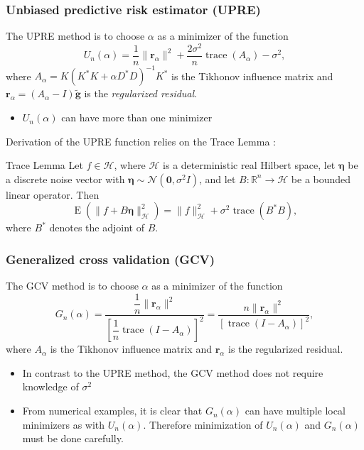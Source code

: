 \documentclass[t]{beamer}
\newcommand{\noiseSD}{\sigma}	%
\DeclareMathOperator{\E}{E}	%
\newcommand{\gnoiseVec}{\widetilde{\mathbf{g}}}	%
\newcommand{\kMat}{K}	%
\newcommand{\ctrans}{*}	%
\DeclareMathOperator{\trace}{trace}		%
\newcommand{\regparam}{\alpha}
\newcommand{\regres}{\mathbf{r}_{\regparam}}	%
\newcommand{\A}{A_{\regparam}}	%
\newcommand{\U}{U}	%
\newcommand{\GCV}{G}	%
\begin{document}
\begin{frame}
\frametitle{Unbiased predictive risk estimator (UPRE)}
The UPRE method \cite{Mallows1973} is to choose $\regparam$ as a minimizer of the function
\[\U_n(\regparam) = \frac{1}{n}\|\regres\|^2 + \frac{2\noiseSD^2}{n}\trace(\A) - \noiseSD^2,\]
where $\A = \kMat(\kMat^\ctrans{\kMat} + \regparam{D^\ctrans}D)^{-1}\kMat^\ctrans$ is the Tikhonov influence matrix and $\regres = (\A - I)\gnoiseVec$ is the \textit{regularized residual}.
\begin{itemize}
\item $\U_n(\regparam)$ can have more than one minimizer \cite[p.~100]{Vogel:2002}
\end{itemize}
Derivation of the UPRE function relies on the Trace Lemma \cite[p.~98]{Vogel:2002}:
\begin{block}{Trace Lemma}
Let $f \in \mathcal{H}$, where $\mathcal{H}$ is a deterministic real Hilbert space, let $\mathbf{\eta}$ be a discrete noise vector with $\mathbf{\eta} \sim \mathcal{N}(\mathbf{0},\noiseSD^2 I)$, and let $B : \mathbb{R}^n \rightarrow \mathcal{H}$ be a bounded linear operator. Then
\[\E(\|f + B\mathbf{\eta}\|^2_{\mathcal{H}}) = \|f\|^2_{\mathcal{H}} + \noiseSD^2 \trace(B^\ctrans{B}),\] 
where $B^\ctrans$ denotes the adjoint of $B$.
\end{block}
\end{frame}

\begin{frame}
\frametitle{Generalized cross validation (GCV)}
The GCV method \cite{Wahba1977,Wahba1990} is to choose $\regparam$ as a minimizer of the function
\[\GCV_n(\regparam) = \frac{\dfrac{1}{n}\|\regres\|^2}{\left[\dfrac{1}{n}\trace(I-\A)\right]^2} = \frac{n\|\regres\|^2}{\left[\trace(I-\A)\right]^2},\]
where $\A$ is the Tikhonov influence matrix and $\regres$ is the regularized residual.
\begin{itemize}
\item In contrast to the UPRE method, the GCV method does not require knowledge of $\noiseSD^2$
\item From numerical examples, it is clear that $\GCV_n(\regparam)$ can have multiple local minimizers as with $\U_n(\regparam)$. Therefore minimization of $\U_n(\regparam)$ and $\GCV_n(\regparam)$ must be done carefully.
\end{itemize}
\end{frame}
\end{document}
